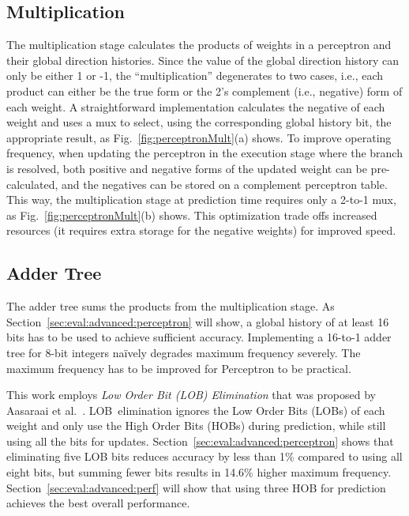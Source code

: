 \subsection{Multiplication}
\label{sec:advanced:perceptron:mult}
The multiplication stage calculates the products of weights in a perceptron and their global direction histories. Since the value of the global direction history can only be either 1 or -1, the ``multiplication'' degenerates to two cases, i.e., each product can either be the true form or the 2's complement (i.e., negative) form of each weight. A straightforward implementation calculates the negative of each weight and uses a mux to select, using the corresponding global history bit, the appropriate result, as Fig.~\ref{fig:perceptronMult}(a) shows. To improve operating frequency, when updating the perceptron in the execution stage where the branch is resolved, both positive and negative forms of the updated weight can be pre-calculated, and the negatives can be stored on a complement perceptron table. This way, the multiplication stage at prediction time requires only a 2-to-1 mux, as Fig.~\ref{fig:perceptronMult}(b) shows. This optimization trade offs increased resources (it requires extra storage for the negative weights) for improved speed.

\subsection{Adder Tree}
\label{sec:advanced:perceptron:adder}
The adder tree sums the products from the multiplication stage. As Section~\ref{sec:eval:advanced:perceptron} will show, a global history of at least 16 bits has to be used to achieve sufficient accuracy. Implementing a 16-to-1 adder tree for 8-bit integers na\"ively degrades maximum frequency severely. The maximum frequency has to be improved for Perceptron to be practical.

This work employs \textit{Low Order Bit (LOB) Elimination} that was proposed by Aasaraai et al.~\cite{lob}. LOB\ elimination ignores the Low Order Bits (LOBs) of each weight and only use the High Order Bits (HOBs) during prediction, while still using all the bits for updates. Section~\ref{sec:eval:advanced:perceptron} shows that eliminating five LOB bits reduces accuracy by less than 1\% compared to using all eight bits, but summing fewer bits results in 14.6\% higher maximum frequency. Section~\ref{sec:eval:advanced:perf} will show that using three HOB for prediction achieves the best overall performance.


